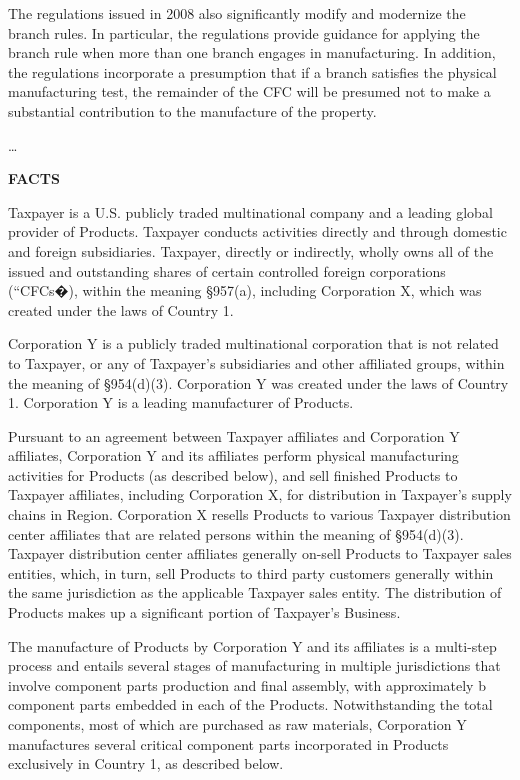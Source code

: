 	The regulations issued in 2008 also significantly modify and modernize the branch rules.  In particular, the regulations provide guidance for applying the branch rule when more than one branch engages in manufacturing.  In addition, the regulations incorporate a presumption that if a branch satisfies the physical manufacturing test, the remainder of the CFC will be presumed not to make a substantial contribution to the manufacture of the property.	

\begin{select}
\ldots\\


\begin{center} \textbf{FACTS}
\end{center}


Taxpayer is a U.S. publicly traded multinational company and a leading global provider of Products. Taxpayer conducts activities directly and through domestic and foreign subsidiaries. Taxpayer, directly or indirectly, wholly owns all of the issued and outstanding shares of certain controlled foreign corporations (``CFCs�), within the meaning \S957(a), including Corporation X, which was created under the laws of Country 1.

Corporation Y is a publicly traded multinational corporation that is not related to Taxpayer, or any of Taxpayer's subsidiaries and other affiliated groups, within the meaning of \S954(d)(3). Corporation Y was created under the laws of Country 1. Corporation Y is a leading manufacturer of Products.

Pursuant to an agreement between Taxpayer affiliates and Corporation Y affiliates, Corporation Y and its affiliates perform physical manufacturing activities for Products (as described below), and sell finished Products to Taxpayer affiliates, including Corporation X, for distribution in Taxpayer's supply chains in Region. Corporation X resells Products to various Taxpayer distribution center affiliates that are related persons within the meaning of \S954(d)(3). Taxpayer distribution center affiliates generally on-sell Products to Taxpayer sales entities, which, in turn, sell Products to third party customers generally within the same jurisdiction as the applicable Taxpayer sales entity. The distribution of Products makes up a significant portion of Taxpayer's Business.

The manufacture of Products by Corporation Y and its affiliates is a multi-step process and entails several stages of manufacturing in multiple jurisdictions that involve component parts production and final assembly, with approximately b component parts embedded in each of the Products. Notwithstanding the total components, most of which are purchased as raw materials, Corporation Y manufactures several critical component parts incorporated in Products exclusively in Country 1, as described below.


\end{select}
